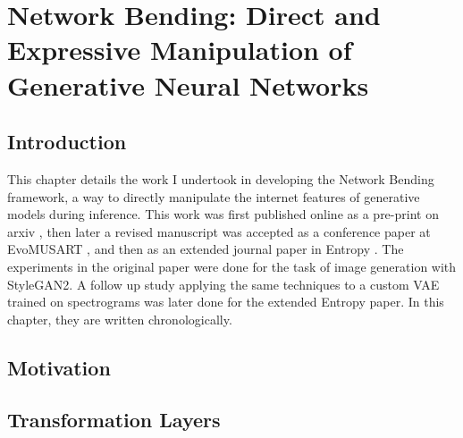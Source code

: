 \chapter{Network Bending: Direct and Expressive Manipulation of Generative Neural Networks}
\label{ch:net_bend}

\section{Introduction}

This chapter details the work I undertook in developing the Network Bending framework, a way to directly manipulate the internet features of generative models during inference. This work was first published online as a pre-print on arxiv \citep{broad2020network}, then later a revised manuscript was accepted as a conference paper at EvoMUSART \citep{broad2021network}, and then as an extended journal paper in Entropy \citep{broad2022network}.
The experiments in the original paper were done for the task of image generation with StyleGAN2. 
A follow up study applying the same techniques to a custom VAE trained on spectrograms was later done for the extended Entropy paper. 
In this chapter, they are written chronologically.

\section{Motivation}

\section{Transformation Layers}

\label{c5:sec:transforms}


